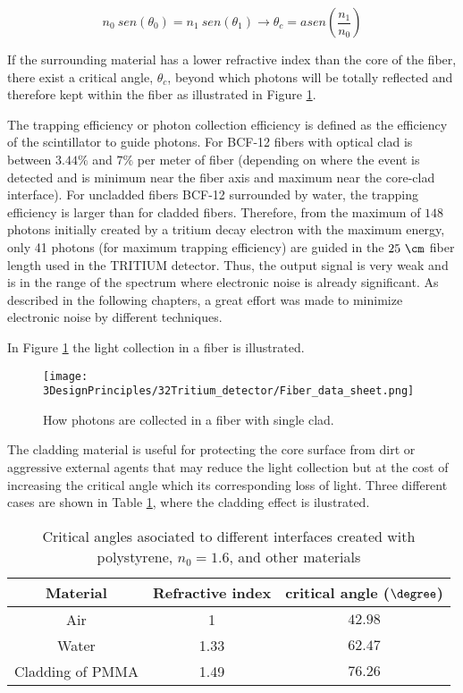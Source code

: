 \begin{equation}
n_0~sen(\theta_0) = n_1~sen(\theta_1) \longrightarrow \theta_c = asen\left(\frac{n_1}{n_0} \right)
\label{eq:Snell}
\end{equation}

If the surrounding material has a lower refractive index than the core of the fiber, there exist a critical angle, $\theta_c$, beyond which photons will be totally reflected and therefore kept within the fiber as illustrated in Figure \ref{fig:Fiber_physic}.

The trapping efficiency or photon collection efficiency is defined as the efficiency of the scintillator to guide photons. For BCF-12 fibers with optical clad is between $3.44\%$ and $7\%$ per meter of fiber (depending on where the event is detected and is minimum near the fiber axis  and maximum near the core-clad interface). For uncladded fibers BCF-12 surrounded by water, the trapping efficiency is larger than for cladded fibers. Therefore, from the maximum of $148$ photons initially created by a tritium decay electron with the maximum energy, only 41 photons (for maximum trapping efficiency) are guided in the $25~\cm$ fiber length used in the TRITIUM detector. Thus, the output signal is very weak and is in the range of the spectrum where electronic noise is already significant. As described in the following chapters, a great effort was made to minimize electronic noise by different techniques.

In Figure \ref{fig:Fiber_physic} the light collection in a fiber is illustrated.

\begin{figure}[htbp]
\centering
\texttt{[image: 3DesignPrinciples/32Tritium\_detector/Fiber\_data\_sheet.png]}
\caption{How photons are collected in a fiber with single clad.\label{fig:Fiber_physic}~\cite{DataSheetBCF12Fiber}}
\end{figure}

The cladding material is useful for protecting the core surface from dirt or aggressive external agents that may reduce the light collection but at the cost of increasing the critical angle which its corresponding loss of light. Three different cases are shown in Table \ref{tab:CriticalAngles}, where the cladding effect is ilustrated.

\begin{table}[htbp]
\begin{center}
\begin{tabular}{|c|c|c|}
\hline
Material & Refractive index & critical angle ($\degree$) \\
\hline \hline \hline
Air & 1 & $42.98$ \\ \hline
Water & 1.33 & $62.47$ \\ \hline
Cladding of PMMA & 1.49 & $76.26$ \\ \hline
\end{tabular}
\caption{Critical angles asociated to different interfaces created with polystyrene, $n_0=1.6$, and other materials}
\label{tab:CriticalAngles}
\end{center}
\end{table}

